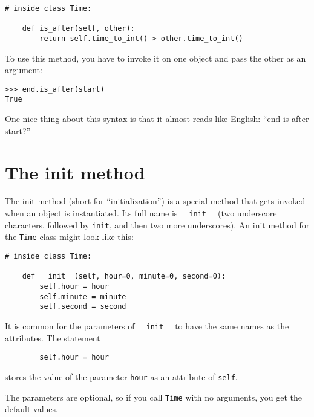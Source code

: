 \begin{lstlisting}
# inside class Time:

    def is_after(self, other):
        return self.time_to_int() > other.time_to_int()
\end{lstlisting}

%
To use this method, you have to invoke it on one object and pass
the other as an argument:

\begin{lstlisting}
>>> end.is_after(start)
True
\end{lstlisting}

%
One nice thing about this syntax is that it almost reads
like English: ``end is after start?''


\section{The init method}

The init method (short for ``initialization'') is
a special method that gets invoked when an object is instantiated.
Its full name is \verb"__init__" (two underscore characters,
followed by {\tt init}, and then two more underscores).  An
init method for the {\tt Time} class might look like this:

\begin{lstlisting}
# inside class Time:

    def __init__(self, hour=0, minute=0, second=0):
        self.hour = hour
        self.minute = minute
        self.second = second
\end{lstlisting}

%
It is common for the parameters of \verb"__init__"
to have the same names as the attributes.  The statement

\begin{lstlisting}
        self.hour = hour
\end{lstlisting}

%
stores the value of the parameter {\tt hour} as an attribute
of {\tt self}.

The parameters are optional, so if you call {\tt Time} with
no arguments, you get the default values.

